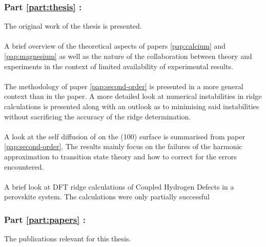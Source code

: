 \subsubsection{Part \ref{part:thesis} : }
The original work of the thesis is presented.

\paragraph{}
A brief overview of the theoretical aspects of papers \ref{pap:calcium} and \ref{pap:magnesium} as well as the nature of the collaboration between theory and experiments in the context of limited availability of experimental results.

\paragraph{}
The methodology of paper \ref{pap:second-order} is presented in a more general context than in the paper.
A more detailed look at numerical instabilities in ridge calculations is presented along with an outlook as to minimising said instabilities without sacrificing the accuracy of the ridge determination.

\paragraph{}
A look at the self diffusion of  on the (100) surface is summarised from paper \ref{pap:second-order}.
The results mainly focus on the failures of the harmonic approximation to transition state theory and how to correct for the errors encountered.

\paragraph{}
A brief look at DFT ridge calculations of Coupled Hydrogen Defects in a  perovskite system.
The calculations were only partially successful \expand

\subsubsection{Part \ref{part:papers} : }
The publications relevant for this thesis.
